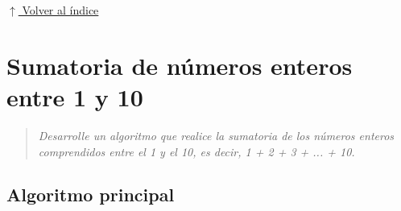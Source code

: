 \documentclass[12pt]{article}
\newcommand{\pseudocodigo}[2]{%
}
\newcommand{\volverindice}{%
    \vspace{1em}%
    \begin{flushright}%
        \hyperlink{indice}{\small $\uparrow$ Volver al índice}%
    \end{flushright}%
}
\newcommand{\enunciado}[1]{%
    \begin{quote}
        \itshape #1
    \end{quote}
}
\begin{document}











\volverindice
\newpage


\section{Sumatoria de números enteros entre 1 y 10}

\enunciado{Desarrolle un algoritmo que realice la sumatoria de los números enteros comprendidos entre el 1 y el 10, es decir, 1 + 2 + 3 + ... + 10.}

\subsection{Algoritmo principal}
\end{document}
